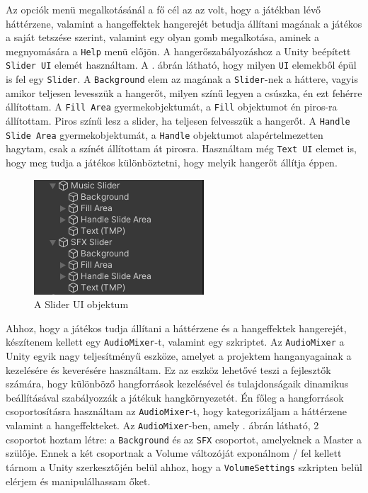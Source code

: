 
Az opciók menü megalkotásánál a fő cél az az volt, hogy a játékban lévő háttérzene, valamint a hangeffektek hangerejét betudja állítani magának a játékos a saját tetszése szerint, valamint egy olyan gomb megalkotása, aminek a megnyomására a \texttt{Help} menü előjön. A hangerőszabályozáshoz a Unity beépített \texttt{Slider UI} elemét használtam. A . ábrán látható, hogy milyen \texttt{UI} elemekből épül is fel egy \texttt{Slider}. A \texttt{Background} elem az magának a \texttt{Slider}-nek a háttere, vagyis amikor teljesen levesszük a hangerőt, milyen színű legyen a csúszka, én ezt fehérre állítottam. A \texttt{Fill Area} gyermekobjektumát, a \texttt{Fill} objektumot én piros-ra állítottam. Piros színű lesz a slider, ha teljesen felvesszük a hangerőt. A \texttt{Handle Slide Area} gyermekobjektumát, a \texttt{Handle} objektumot alapértelmezetten hagytam, csak a színét állítottam át pirosra. Használtam még \texttt{Text UI} elemet is, hogy meg tudja a játékos különböztetni, hogy melyik hangerőt állítja éppen.

\begin{figure}[ht]
\centering
\includegraphics[scale = 1.0]{images/slider.png}
\caption{A Slider UI objektum}
\label{fig:slider}
\end{figure}

\newpage
Ahhoz, hogy a játékos tudja állítani a háttérzene és a hangeffektek hangerejét, készítenem kellett egy \texttt{AudioMixer}-t, valamint egy szkriptet. Az \texttt{AudioMixer} a Unity egyik nagy teljesítményű eszköze, amelyet a projektem hanganyagainak a kezelésére és keverésére használtam. Ez az eszköz lehetővé teszi a fejlesztők számára, hogy különböző hangforrások kezelésével és tulajdonságaik dinamikus beállításával szabályozzák a játékuk hangkörnyezetét. Én főleg a hangforrások csoportosításra használtam az \texttt{AudioMixer}-t, hogy kategorizáljam a háttérzene valamint a hangeffekteket. Az \texttt{AudioMixer}-ben, amely . ábrán látható, 2 csoportot hoztam létre: a \texttt{Background} és az \texttt{SFX} csoportot, amelyeknek a Master a szülője. Ennek a két csoportnak a Volume változóját exponálnom / fel kellett tárnom a Unity szerkesztőjén belül ahhoz, hogy a \texttt{VolumeSettings} szkripten belül elérjem és manipulálhassam őket.

